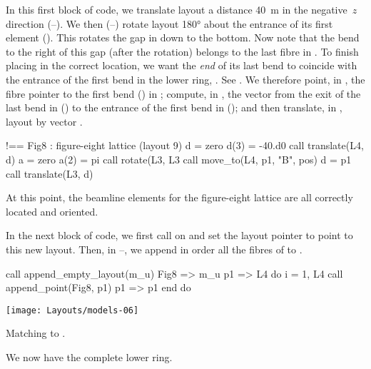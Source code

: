 %
In this first block of code, we translate layout  a
distance \SI{40}{m} in the negative~$z$ direction
(--).
We then (--) rotate layout
 \ang{180} about the entrance of its first element
(). This rotates the gap in 
down to the bottom. Now note that the bend to the right of this
gap (after the rotation) belongs to the last fibre in .
To finish placing  in the correct location, we want the
\emph{end} of its last bend to coincide with the entrance of the
first bend in the lower ring, . See .
We therefore point, in , the fibre pointer
 to the first bend () in ; compute, in
, the vector  from the exit of the last
bend in  () to the entrance of
the first bend in  (); and then
translate, in , layout  by vector .
%
\begin{ptccode}
!== Fig8 : figure-eight lattice (layout 9)
d = zero                                \label{lin:fig8.btr4}
d(3) = -40.d0
call translate(L4, d)                   \label{lin:fig8.etr4}
a = zero                                \label{lin:fig8.brot}
a(2) = pi
call rotate(L3, L3%
call move_to(L4, p1, "B", pos)          \label{lin:fig8.mvp1}
d = p1%
call translate(L3, d)                   \label{lin:fig8.tr3}
\end{ptccode}
%
At this point, the beamline elements for the figure-eight lattice
are all correctly located and oriented.



%
In the next block of code, we first call 
on  and set the layout pointer  to point to this
new layout. Then, in --,
we append in order all the fibres of  to .
%
\begin{ptccode}
call append_empty_layout(m_u)
Fig8 => m_u%
p1 => L4%
do i = 1, L4%
  call append_point(Fig8, p1)
  p1 => p1%
end do                         \label{lin:fig8.eapp.L4}
\end{ptccode}
%
\begin{marginfigure}[-29\baselineskip]\forceversofloat
  \texttt{[image: Layouts/models-06]}
  \caption{Matching  to .}
  \label{fig:ring.match}
\end{marginfigure}
We now have the complete lower ring.

